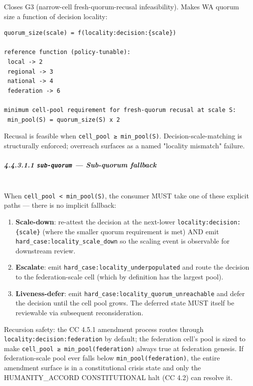 \documentclass[11pt]{article}
\begin{document}
Closes G3 (narrow-cell fresh-quorum-recusal infeasibility). Makes WA quorum size a function of decision locality:


\begin{lstlisting}
quorum_size(scale) = f(locality:decision:{scale})

reference function (policy-tunable):
 local -> 2
 regional -> 3
 national -> 4
 federation -> 6

minimum cell-pool requirement for fresh-quorum recusal at scale S:
 min_pool(S) = quorum_size(S) x 2
\end{lstlisting}

Recusal is feasible when \texttt{cell\_pool ≥ min\_pool(S)}. Decision-scale-matching is structurally enforced; overreach surfaces as a named "locality mismatch" failure.


\subparagraph{4.4.3.1.1 \texttt{sub-quorum} — Sub-quorum fallback}\mbox{}\\


When \texttt{cell\_pool < min\_pool(S)}, the consumer MUST take one of these explicit paths — there is no implicit fallback:


\begin{enumerate}\setlength\itemsep{0pt}
\item \textbf{Scale-down}: re-attest the decision at the next-lower \texttt{locality:decision:\{scale\}} (where the smaller quorum requirement is met) AND emit \texttt{hard\_case:locality\_scale\_down} so the scaling event is observable for downstream review.
\item \textbf{Escalate}: emit \texttt{hard\_case:locality\_underpopulated} and route the decision to the federation-scale cell (which by definition has the largest pool).
\item \textbf{Liveness-defer}: emit \texttt{hard\_case:locality\_quorum\_unreachable} and defer the decision until the cell pool grows. The deferred state MUST itself be reviewable via subsequent reconsideration.
\end{enumerate}


Recursion safety: the CC 4.5.1 amendment process routes through \texttt{locality:decision:federation} by default; the federation cell's pool is sized to make \texttt{cell\_pool ≥ min\_pool(federation)} always true at federation genesis. If federation-scale pool ever falls below \texttt{min\_pool(federation)}, the entire amendment surface is in a constitutional crisis state and only the HUMANITY\_ACCORD CONSTITUTIONAL halt (CC 4.2) can resolve it.
\end{document}
